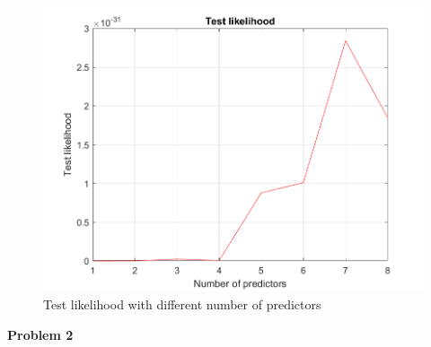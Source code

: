 \documentclass[12pt]{article}
\begin{document}
\begin{figure}[h!]
\begin{center}
  \caption{Test likelihood with different number of predictors}
  \includegraphics[width=1\textwidth]{images/HW4.png}
 \end{center}
\end{figure}
\textbf{Problem 2}
\end{document}
